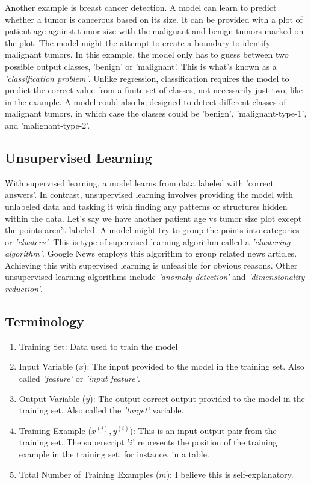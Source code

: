 \documentclass{article}
\begin{document}
Another example is breast cancer detection. A model can learn to predict whether a tumor is cancerous based on its size. It can be provided with a plot of patient age against tumor size with the malignant and benign tumors marked on the plot. The model might the attempt to create a boundary to identify malignant tumors. In this example, the model only has to guess between two possible output classes, 'benign' or 'malignant'. This is what's known as a \textit{'classification problem'}. Unlike regression, classification requires the model to predict the correct value from a finite set of classes, not necessarily just two, like in the example. A model could also be designed to detect different classes of malignant tumors, in which case the classes could be 'benign', 'malignant-type-1', and 'malignant-type-2'.

\subsection{Unsupervised Learning}
With supervised learning, a model learns from data labeled with 'correct answers'. In contrast, unsupervised learning involves providing the model with unlabeled data and tasking it with finding any patterns or structures hidden within the data. Let's say we have another patient age vs tumor size plot except the points aren't labeled. A model might try to group the points into categories or \textit{'clusters'}. This is type of supervised learning algorithm called a \textit{'clustering algorithm'}. Google News employs this algorithm to group related news articles. Achieving this with supervised learning is unfeasible for obvious reasons. Other unsupervised learning algorithms include \textit{'anomaly detection'} and \textit{'dimensionality reduction'}.

\subsection{Terminology}

\begin{enumerate}

\item Training Set: Data used to train the model
\item Input Variable ($x$): The input provided to the model in the training set. Also called \textit{'feature'} or \textit{'input feature'}.
\item Output Variable ($y$):  The output correct output provided to the model in the training set. Also called the \textit{'target'} variable.
\item Training Example ($x^{(i)}, y^{(i)}$): This is an input output pair from the training set. The superscript '$i$' represents the position of the training example in the training set, for instance, in a table.
\item Total Number of Training Examples ($m$): I believe this is self-explanatory.

\end{enumerate}
\end{document}

